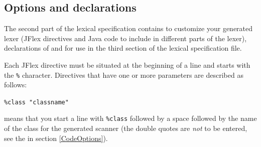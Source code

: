\documentclass[11pt]{scrartcl}
\begin{document}
\subsection{Options and declarations\label{SpecOptions}}
The second part of the lexical specification contains 
to customize your generated lexer (JFlex directives and Java code to include in
different parts of the lexer), declarations of  and 
 for use in the third section 
 of the lexical specification file.
\label{SpecOptDirectives}

Each JFlex directive must be situated at the beginning of  a line
and starts with the \texttt{\%} character. Directives that have one or
more parameters are described as follows:

\texttt{\%class "classname"}

means that you start a line with \texttt{\%class} followed by a space followed
by the name of the class for the generated scanner (the double quotes are
\emph{not} to be entered, see the  in
section \ref{CodeOptions}).
 
\end{document}
